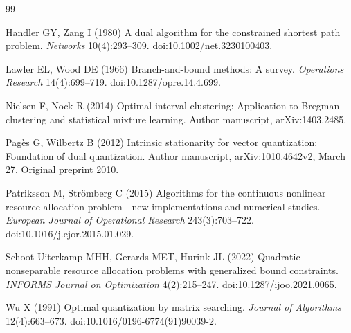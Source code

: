 \begin{thebibliography}{99}\raggedright
{}
Handler GY, Zang I (1980) A dual algorithm for the constrained shortest path problem. \emph{Networks} 10(4):293--309. doi:10.1002/net.3230100403.

Lawler EL, Wood DE (1966) Branch-and-bound methods: A survey. \emph{Operations Research} 14(4):699--719. doi:10.1287/opre.14.4.699.

Nielsen F, Nock R (2014) Optimal interval clustering: Application to Bregman clustering and statistical mixture learning. Author manuscript, arXiv:1403.2485.

Pag\`es G, Wilbertz B (2012) Intrinsic stationarity for vector quantization: Foundation of dual quantization. Author manuscript, arXiv:1010.4642v2, March 27. Original preprint 2010.

Patriksson M, Str{\"o}mberg C (2015) Algorithms for the continuous nonlinear resource allocation problem---new implementations and numerical studies. \emph{European Journal of Operational Research} 243(3):703--722. doi:10.1016/j.ejor.2015.01.029.

Schoot Uiterkamp MHH, Gerards MET, Hurink JL (2022) Quadratic nonseparable resource allocation problems with generalized bound constraints. \emph{INFORMS Journal on Optimization} 4(2):215--247. doi:10.1287/ijoo.2021.0065.

Wu X (1991) Optimal quantization by matrix searching. \emph{Journal of Algorithms} 12(4):663--673. doi:10.1016/0196-6774(91)90039-2.
\end{thebibliography}
